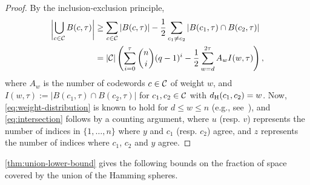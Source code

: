 \documentclass[conference]{IEEEtran}
\begin{document}
\begin{proof}
    By the inclusion-exclusion principle, %
    \begin{align*}
        \bigabs{\bigcup_{c \in \CC} B(c, \tau)} 
        &\ge \sum_{c \in \CC} |B(c, \tau)| - \frac{1}{2} \sum_{c_{1} \neq c_{2}} |B(c_{1}, \tau) \cap B(c_{2}, \tau)| \\ 
        &= |\CC| \left(\sum_{i = 0}^{\tau} \binom{n}{i} (q - 1)^{i} 
        - \frac{1}{2} \sum_{w = d}^{2 \tau} A_{w} I(w, \tau)\right), 
    \end{align*}
    where $A_{w}$ is the number of codewords $c \in {\mathcal C}$ of weight $w$, and $I(w, \tau) := |B(c_{1}, \tau) \cap B(c_{2}, \tau)|$ for $c_{1}, c_{2} \in {\mathcal C}$ with $d_{{\rm H}}(c_{1}, c_{2}) = w$. 
    Now, \eqref{eq:weight-distribution} is known to hold for $d \le w \le n$ (e.g., see~\cite{Macwilliams77}), and \eqref{eq:intersection} follows by a counting argument, where $u$ (resp. $v$) represents the number of indices in $\{1, \dots, n\}$ where $y$ and $c_{1}$ (resp. $c_{2}$) agree, and $z$ represents the number of indices where $c_{1}$, $c_{2}$ and $y$ agree. 
\end{proof}



\autoref{thm:union-lower-bound} gives the following bounds on the fraction of space covered by the union of the Hamming spheres. 

\end{document}
